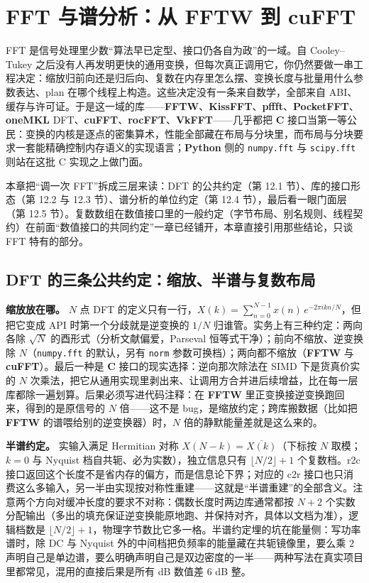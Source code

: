 \documentclass[12pt,a4paper,fontset=fandol]{ctexbook}
\newcommand{\Tp}[1]{\texttt{#1}}
\newcommand{\Lib}[1]{\textbf{#1}}
\newcommand{\Lang}[1]{\textsf{\bfseries #1}}
\newcommand{\CL}{\Lang{C}}
\newcommand{\PY}{\Lang{Python}}
\begin{document}
\chapter{FFT 与谱分析：从 FFTW 到 cuFFT}

FFT 是信号处理里少数``算法早已定型、接口仍各自为政''的一域。自 Cooley--Tukey 之后没有人再发明更快的通用变换，但每次真正调用它，你仍然要做一串工程决定：缩放归前向还是归后向、复数在内存里怎么摆、变换长度与批量用什么参数表达、plan 在哪个线程上构造。这些决定没有一条来自数学，全部来自 ABI、缓存与许可证。于是这一域的库——\Lib{FFTW}、\Lib{KissFFT}、\Lib{pffft}、\Lib{PocketFFT}、\Lib{oneMKL} DFT、\Lib{cuFFT}、\Lib{rocFFT}、\Lib{VkFFT}——几乎都把 \CL{} 接口当第一等公民：变换的内核是逐点的密集算术，性能全部藏在布局与分块里，而布局与分块要求一套能精确控制内存语义的实现语言；\PY{} 侧的 \Tp{numpy.fft} 与 \Tp{scipy.fft} 则站在这批 C 实现之上做门面。

本章把``调一次 FFT''拆成三层来读：DFT 的公共约定（第 12.1 节）、库的接口形态（第 12.2 与 12.3 节）、谱分析的单位约定（第 12.4 节），最后看一眼门面层（第 12.5 节）。复数数组在数值接口里的一般约定（字节布局、别名规则、线程契约）在前面``数值接口的共同约定''一章已经铺开，本章直接引用那些结论，只谈 FFT 特有的部分。

\section{DFT 的三条公共约定：缩放、半谱与复数布局}

\textbf{缩放放在哪。} $N$ 点 DFT 的定义只有一行，$X(k) = \sum_{n=0}^{N-1} x(n)\, e^{-2\pi i k n / N}$，但把它变成 API 时第一个分歧就是逆变换的 $1/N$ 归谁管。实务上有三种约定：两向各除 $\sqrt{N}$ 的酉形式（分析文献偏爱，Parseval 恒等式干净）；前向不缩放、逆变换除 $N$（\Tp{numpy.fft} 的默认，另有 \Tp{norm} 参数可换档）；两向都不缩放（\Lib{FFTW} 与 \Lib{cuFFT}）。最后一种是 \CL{} 接口的现实选择：逆向那次除法在 SIMD 下是货真价实的 $N$ 次乘法，把它从通用实现里剥出来、让调用方合并进后续增益，比在每一层库都除一遍划算。后果必须写进代码注释：在 \Lib{FFTW} 里正变换接逆变换跑回来，得到的是原信号的 $N$ 倍——这不是 bug，是缩放约定；跨库搬数据（比如把 \Lib{FFTW} 的谱喂给别的逆变换器）时，$N$ 倍的静默能量差就是这么来的。

\textbf{半谱约定。} 实输入满足 Hermitian 对称 $X(N-k) = \overline{X(k)}$（下标按 $N$ 取模；$k = 0$ 与 Nyquist 档自共轭、必为实数），独立信息只有 $\lfloor N/2 \rfloor + 1$ 个复数档。r2c 接口返回这个长度不是省内存的偏方，而是信息论下界；对应的 c2r 接口也只消费这么多输入，另一半由实现按对称性重建——这就是``半谱重建''的全部含义。注意两个方向对缓冲长度的要求不对称：偶数长度时两边库通常都按 $N+2$ 个实数分配输出（多出的填充保证逆变换能原地跑、并保持对齐，具体以文档为准），逻辑档数是 $\lfloor N/2 \rfloor + 1$，物理字节数比它多一格。半谱约定埋的坑在能量侧：写功率谱时，除 DC 与 Nyquist 外的中间档把负频率的能量藏在共轭镜像里，要么乘 $2$ 声明自己是单边谱，要么明确声明自己是双边密度的一半——两种写法在真实项目里都常见，混用的直接后果是所有 dB 数值差 $6$ dB 整。
\end{document}
